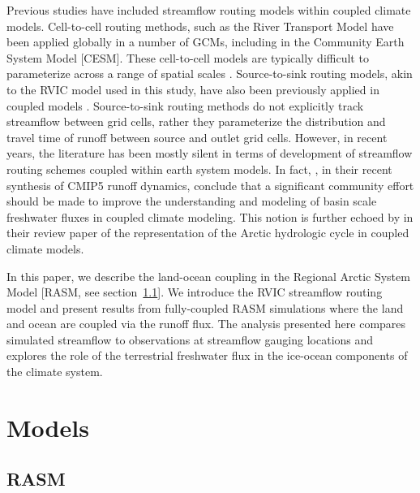 \documentclass[jgrga, draft]{agutex}
\begin{document}
\begin{article}
Previous studies have included streamflow routing models within coupled climate models.
Cell-to-cell routing methods, such as the River Transport Model \citep[RTM][]{Branstetter_2003} have been applied globally in a number of GCMs, including in the Community Earth System Model [CESM].
These cell-to-cell models are typically difficult to parameterize across a range of spatial scales \citep{Sushama_2004}.
Source-to-sink routing models, akin to the RVIC model used in this study, have also been previously applied in coupled models \citep[e.g.][]{Olivera_2000}.
Source-to-sink routing methods do not explicitly track streamflow between grid cells, rather they parameterize the distribution and travel time of runoff between source and outlet grid cells.
However, in recent years, the literature has been mostly silent in terms of development of streamflow routing schemes coupled within earth system models.
In fact, \citet{Bring_2015}, in their recent synthesis of CMIP5 runoff dynamics, conclude that a significant community effort should be made to improve the understanding and modeling of basin scale freshwater fluxes in coupled climate modeling.
This notion is further echoed by \citet{Lique_2015} in their review paper of the representation of the Arctic hydrologic cycle in coupled climate models.

In this paper, we describe the land-ocean coupling in the Regional Arctic System Model [RASM, see section~\ref{sec:rasm}].
We introduce the RVIC streamflow routing model and present results from fully-coupled RASM simulations where the land and ocean are coupled via the runoff flux.
The analysis presented here compares simulated streamflow to observations at streamflow gauging locations and explores the role of the terrestrial freshwater flux in the ice-ocean components of the climate system.

\section{Models}

\subsection{RASM}
\label{sec:rasm}


\end{article}
\end{document}
